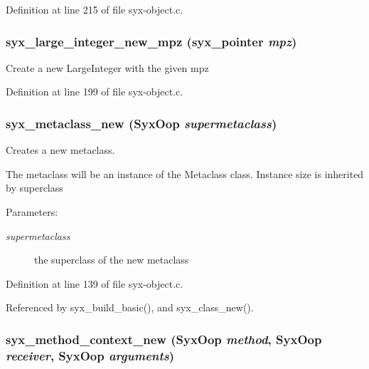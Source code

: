 Definition at line 215 of file syx-object.c.\hypertarget{syx-object_8c_4c020d3a248873725c51ee27b0e4d133}{
\subsubsection{ syx\_\-large\_\-integer\_\-new\_\-mpz ({\bf syx\_\-pointer} {\em mpz})}}
\label{syx-object_8c_4c020d3a248873725c51ee27b0e4d133}


Create a new LargeInteger with the given mpz 

Definition at line 199 of file syx-object.c.\hypertarget{syx-object_8c_0624244f32f755ddc9c08d20672874a4}{
\subsubsection{ syx\_\-metaclass\_\-new ({\bf SyxOop} {\em supermetaclass})}}
\label{syx-object_8c_0624244f32f755ddc9c08d20672874a4}


Creates a new metaclass.

The metaclass will be an instance of the Metaclass class. Instance size is inherited by superclass

\begin{Desc}
\item[Parameters:]
\begin{description}
\item[{\em supermetaclass}]the superclass of the new metaclass \end{description}
\end{Desc}


Definition at line 139 of file syx-object.c.

Referenced by syx\_\-build\_\-basic(), and syx\_\-class\_\-new().\hypertarget{syx-object_8c_d27128de6c8566b5bc0c667c8bf4c5b0}{
\subsubsection{ syx\_\-method\_\-context\_\-new ({\bf SyxOop} {\em method}, \/  {\bf SyxOop} {\em receiver}, \/  {\bf SyxOop} {\em arguments})}}
\label{syx-object_8c_d27128de6c8566b5bc0c667c8bf4c5b0}


